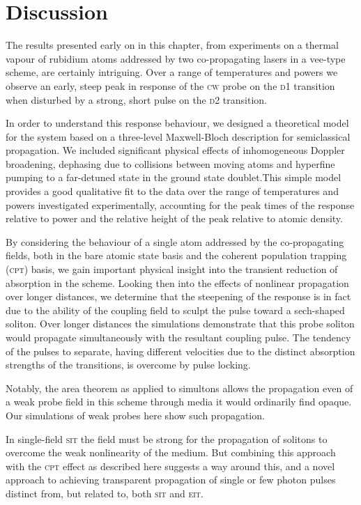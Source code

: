 \section{Discussion}
  \label{sec:simultons_discussion}

  The results presented early on in this chapter, from experiments on a thermal
  vapour of rubidium atoms addressed by two co-propagating lasers in a vee-type
  scheme, are certainly intriguing. Over a range of temperatures and powers we
  observe an early, steep peak in response of the \textsc{cw} probe on the
  \textsc{d1} transition when disturbed by a strong, short pulse on the
  \textsc{d2} transition.

  In order to understand this response behaviour, we designed a theoretical
  model for the system based on a three-level Maxwell-Bloch description for
  semiclassical propagation. We included significant physical effects of
  inhomogeneous Doppler broadening, dephasing due to collisions between moving
  atoms and hyperfine pumping to a far-detuned state in the ground state
  doublet.This simple model provides a good qualitative fit to the data over the
  range of temperatures and powers investigated experimentally, accounting for
  the peak times of the response relative to power and the relative height of
  the peak relative to atomic density.

  By considering the behaviour of a single atom addressed by the co-propagating
  fields, both in the bare atomic state basis and the coherent population
  trapping (\textsc{cpt}) basis, we gain important physical insight into the
  transient reduction of absorption in the scheme. Looking then into the effects
  of nonlinear propagation over longer distances, we determine that the
  steepening of the response is in fact due to the ability of the coupling field
  to sculpt the pulse toward a sech-shaped soliton. Over longer distances the
  simulations demonstrate that this probe soliton would propagate simultaneously
  with the resultant coupling pulse. The tendency of the pulses to separate,
  having different velocities due to the distinct absorption strengths of the
  transitions, is overcome by pulse locking.

  Notably, the area theorem as applied to simultons allows the propagation even
  of a weak probe field in this scheme through media it would ordinarily find
  opaque. Our simulations of weak probes here show such propagation.

  In single-field \textsc{sit} the field must be strong for the propagation of
  solitons to overcome the weak nonlinearity of the medium. But combining this
  approach with the \textsc{cpt} effect as described here suggests a way around
  this, and a novel approach to achieving transparent propagation of single or
  few photon pulses distinct from, but related to, both \textsc{sit} and
  \textsc{eit}.


